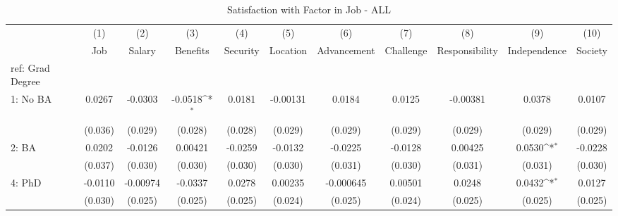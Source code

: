 \begin{table}[htbp]\centering
\def\sym#1{\ifmmode^{#1}\else\(^{#1}\)\fi}
\caption{Satisfaction with Factor in Job - ALL \label{tab1}}
\begin{tabular}{l*{10}{c}}
\hline\hline
  &\multicolumn{1}{c}{(1)}&\multicolumn{1}{c}{(2)}&\multicolumn{1}{c}{(3)}&\multicolumn{1}{c}{(4)}&\multicolumn{1}{c}{(5)}&\multicolumn{1}{c}{(6)}&\multicolumn{1}{c}{(7)}&\multicolumn{1}{c}{(8)}&\multicolumn{1}{c}{(9)}&\multicolumn{1}{c}{(10)}\\
  &\multicolumn{1}{c}{Job}&\multicolumn{1}{c}{Salary}&\multicolumn{1}{c}{Benefits}&\multicolumn{1}{c}{Security}&\multicolumn{1}{c}{Location}&\multicolumn{1}{c}{Advancement}&\multicolumn{1}{c}{Challenge}&\multicolumn{1}{c}{Responsibility}&\multicolumn{1}{c}{Independence}&\multicolumn{1}{c}{Society}\\
\hline
ref: Grad Degree&                     &                     &                     &                     &                     &                     &                     &                     &                     &                     \\
[1em]
1: No BA&      0.0267         &     -0.0303         &     -0.0518\sym{*}  &      0.0181         &    -0.00131         &      0.0184         &      0.0125         &    -0.00381         &      0.0378         &      0.0107         \\
  &     (0.036)         &     (0.029)         &     (0.028)         &     (0.028)         &     (0.029)         &     (0.029)         &     (0.029)         &     (0.029)         &     (0.029)         &     (0.029)         \\
[1em]
2: BA&      0.0202         &     -0.0126         &     0.00421         &     -0.0259         &     -0.0132         &     -0.0225         &     -0.0128         &     0.00425         &      0.0530\sym{*}  &     -0.0228         \\
  &     (0.037)         &     (0.030)         &     (0.030)         &     (0.030)         &     (0.030)         &     (0.031)         &     (0.030)         &     (0.031)         &     (0.031)         &     (0.030)         \\
[1em]
4: PhD&     -0.0110         &    -0.00974         &     -0.0337         &      0.0278         &     0.00235         &   -0.000645         &     0.00501         &      0.0248         &      0.0432\sym{*}  &      0.0127         \\
  &     (0.030)         &     (0.025)         &     (0.025)         &     (0.025)         &     (0.024)         &     (0.025)         &     (0.024)         &     (0.025)         &     (0.025)         &     (0.025)         \\

\end{tabular}
\end{table}

